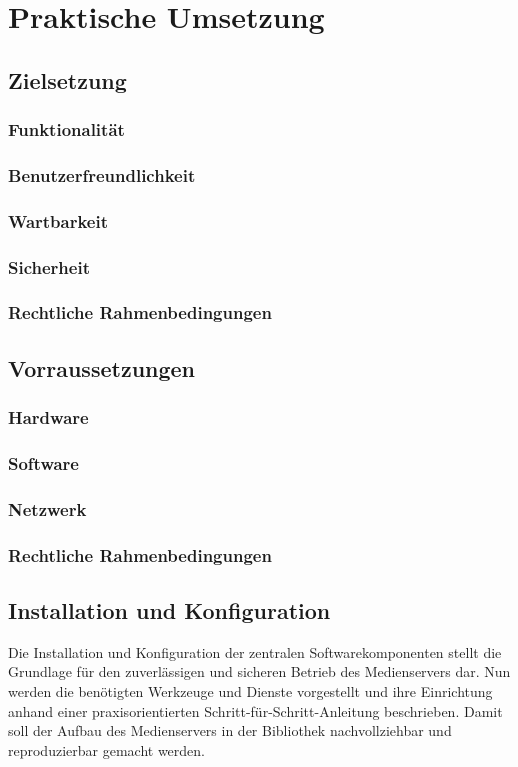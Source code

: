\documentclass[12pt,a4paper]{report}
\begin{document}
\chapter*{Praktische Umsetzung}
\setcounter{section}{0}

\section{Zielsetzung}
  \subsection{Funktionalität}
  \subsection{Benutzerfreundlichkeit}
  \subsection{Wartbarkeit}
  \subsection{Sicherheit}
  \subsection{Rechtliche Rahmenbedingungen}
\section{Vorraussetzungen}
  \subsection{Hardware}
  \subsection{Software}
  \subsection{Netzwerk}
  \subsection{Rechtliche Rahmenbedingungen}
\section{Installation und Konfiguration}  
Die Installation und Konfiguration der zentralen Softwarekomponenten stellt die Grundlage für den zuverlässigen und sicheren Betrieb des Medienservers dar.
Nun werden die benötigten Werkzeuge und Dienste vorgestellt und ihre Einrichtung anhand einer praxisorientierten Schritt-für-Schritt-Anleitung beschrieben.
Damit soll der Aufbau des Medienservers in der Bibliothek nachvollziehbar und reproduzierbar gemacht werden.
\end{document}
